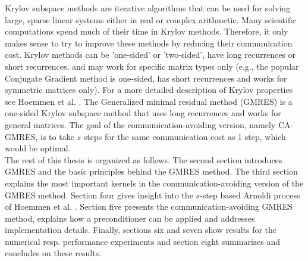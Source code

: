 \documentclass{scrartcl}
\numberwithin{equation}{section}
\begin{document}
Krylov subspace methods are iterative algorithms that can be used for solving large, sparse linear systems either in real or complex arithmetic. Many scientific computations spend much of their time in Krylov methods. Therefore, it only makes sense to try to improve these methods by reducing their communication cost. Krylov methods can be 'one-sided' or 'two-sided', have long recurrences or short recurrences, and may work for specific matrix types only (e.g., the popular Conjugate Gradient method is one-sided, has short recurrences and works for symmetric matrices only). For a more detailed description of Krylov properties see Hoemmen et al. \cite{Hoemmen:2010:CKS:1970638}. The Generalized minimal residual method (GMRES) is a one-sided Krylov subspace method that uses long recurrences and works for general matrices. The goal of the communication-avoiding version, namely CA-GMRES, is to take $s$ steps for the same communication cost as 1 step, which would be optimal.\\

The rest of this thesis is organized as follows. The second section introduces GMRES and the basic principles behind the GMRES method. The third section explains the most important kernels in the communication-avoiding version of the GMRES method. Section four gives insight into the $s$-step based Arnoldi process of Hoemmen et al. \cite{Hoemmen:2010:CKS:1970638}. Section five presents the communication-avoiding GMRES method, explains how a preconditioner can be applied and addresses implementation details. Finally, sections six and seven show results for the numerical resp. performance experiments and section eight summarizes and concludes on these results.
 
\end{document}
